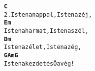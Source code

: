 \begin{minipage}{\textwidth}
\kottastart
{}
\kottaend
\begin{minipage}{\textwidth}
\begin{alltt}
\textbf{   C}
2. Isten a nappal, Isten az éj,
\textbf{   Em}
   Isten a harmat, Isten a szél,
\textbf{   Dm}
   Isten az élet, Isten az ég,
\textbf{   G                      Am  G}
   Isten a kezdet és Ő a vég!
\end{alltt}
\vspace{0.0cm}
\versszakspacing
\end{minipage}
\end{minipage}
~\vspace{1.0cm}
\newline
